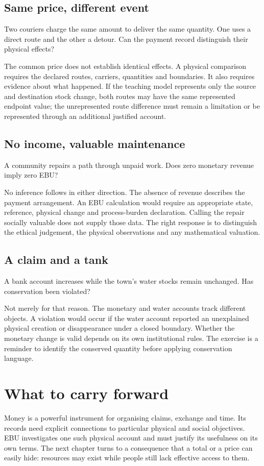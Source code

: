 \subsection{Same price, different event}
Two couriers charge the same amount to deliver the same quantity. One uses a direct route and the other a detour. Can the payment record distinguish their physical effects?

The common price does not establish identical effects. A physical comparison requires the declared routes, carriers, quantities and boundaries. It also requires evidence about what happened. If the teaching model represents only the source and destination stock change, both routes may have the same represented endpoint value; the unrepresented route difference must remain a limitation or be represented through an additional justified account.

\subsection{No income, valuable maintenance}
A community repairs a path through unpaid work. Does zero monetary revenue imply zero EBU?

No inference follows in either direction. The absence of revenue describes the payment arrangement. An EBU calculation would require an appropriate state, reference, physical change and process-burden declaration. Calling the repair socially valuable does not supply those data. The right response is to distinguish the ethical judgement, the physical observations and any mathematical valuation.

\subsection{A claim and a tank}
A bank account increases while the town's water stocks remain unchanged. Has conservation been violated?

Not merely for that reason. The monetary and water accounts track different objects. A violation would occur if the water account reported an unexplained physical creation or disappearance under a closed boundary. Whether the monetary change is valid depends on its own institutional rules. The exercise is a reminder to identify the conserved quantity before applying conservation language.

\section{What to carry forward}
Money is a powerful instrument for organising claims, exchange and time. Its records need explicit connections to particular physical and social objectives. EBU investigates one such physical account and must justify its usefulness on its own terms. The next chapter turns to a consequence that a total or a price can easily hide: resources may exist while people still lack effective access to them.
